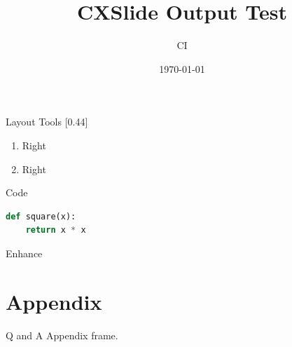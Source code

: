 \documentclass[aspectratio=169, UTF8]{ctexbeamer}
\title{CXSlide Output Test}
\author{CI}
\date{\today}
\begin{document}
\begin{frame}
  \titlepage
\end{frame}

\begin{frame}{Layout Tools}
  [0.44]{%
    \begin{enumerate}
      \item Right
      \item Right
    \end{enumerate}
  }
\end{frame}

\begin{frame}[fragile]{Code}
\begin{lstlisting}[language=Python]
def square(x):
    return x * x
\end{lstlisting}
\end{frame}

\begin{frame}{Enhance}
\end{frame}

\appendix
\section{Appendix}

\begin{frame}{Q and A}
  Appendix frame.
\end{frame}
\end{document}
